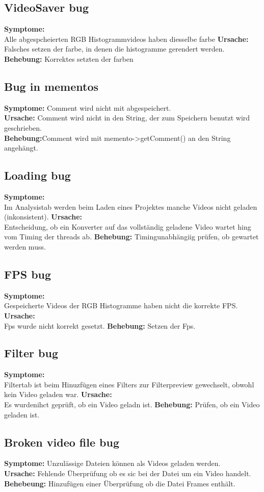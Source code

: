 \documentclass{scrartcl}
\begin{document}
{\subsection{VideoSaver bug}
\textbf{Symptome:}\\
Alle abgespcheierten RGB Histogrammvideos haben diesselbe farbe
\textbf{Ursache:}\\
Falsches setzen der farbe, in denen die histogramme gerendert werden.
\textbf{Behebung:}
Korrektes setzten der farben
\subsection{Bug in mementos}
\textbf{Symptome:} Comment wird nicht mit abgespeichert.\\
\textbf{Ursache:} Comment wird nicht in den String, der zum Speichern benutzt wird geschrieben.\\
\textbf{Behebung:}Comment wird mit memento->getComment() an den String angehängt.
\subsection{Loading bug}
\textbf{Symptome:}\\
Im Analysistab werden beim Laden eines Projektes manche Videos nicht geladen (inkonsistent).
\textbf{Ursache:}\\
Entscheidung, ob ein Konverter auf das vollständig geladene Video wartet hing vom Timing der threads ab.
\textbf{Behebung:}
Timingunabhängiig prüfen, ob gewartet werden muss.
\subsection{FPS bug}
\textbf{Symptome:}\\
Gespeicherte Videos der RGB Histogramme haben nicht die korrekte FPS.
\textbf{Ursache:}\\
Fps wurde nicht korrekt gesetzt.
\textbf{Behebung:}
Setzen der Fps.
\subsection{Filter bug}
\textbf{Symptome:}\\
Filtertab ist beim Hinuzfügen eines Filters zur Filterpreview gewechselt, obwohl kein Video geladen war.
\textbf{Ursache:}\\
Es wurdenihct geprüft, ob ein Video geladn ist.
\textbf{Behebung:}
Prüfen, ob ein Video geladen ist.
\subsection{Broken video file bug}
\textbf{Symptome:} Unzulässige Dateien können als Videos geladen werden.\\
\textbf{Ursache:} Fehlende Überprüfung ob es sic bei der Datei um ein Video handelt.\\
\textbf{Behebeung:} Hinzufügen einer Überprüfung ob die Datei Frames enthält.
}
\end{document}
